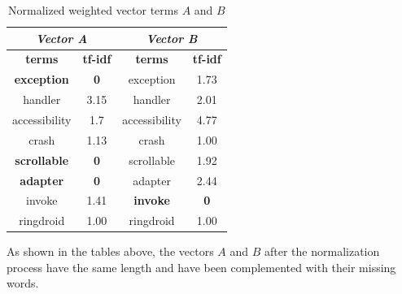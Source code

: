 \begin{table}[htb]
\centering
\caption{Normalized weighted vector terms $A$ and $B$}
\label{tbl: afternormal}
\begin{tabular}{|c|c|c|c|}
\hline
\multicolumn{2}{|c|}{{\color[HTML]{000000} \textit{\textbf{Vector A}}}} & \multicolumn{2}{c|}{{\color[HTML]{000000} \textit{\textbf{Vector B}}}} \\ \hline
\textbf{terms}                     & \textbf{tf-idf}                    & \textbf{terms}                    & \textbf{tf-idf}                    \\ \hline
\textbf{exception}                          & \textbf{0}                         & exception                         & 1.73                               \\ \hline
handler                            & 3.15                               & handler                           & 2.01                               \\ \hline
accessibility                      & 1.7                                & accessibility                     & 4.77                               \\ \hline
crash                              & 1.13                               & crash                             & 1.00                               \\ \hline
\textbf{scrollable}                         & \textbf{0}                         & scrollable                        & 1.92                               \\ \hline
\textbf{adapter}                            & \textbf{0}                         & adapter                           & 2.44                               \\ \hline
invoke                             & 1.41                               & \textbf{invoke}                            & \textbf{0}                         \\ \hline
ringdroid                          & 1.00                               & ringdroid                         & 1.00                               \\ \hline
\end{tabular}
\end{table}
As shown in the tables above, the vectors $A$ and $B$ after the normalization process have the same length and have been complemented with their missing words. 

